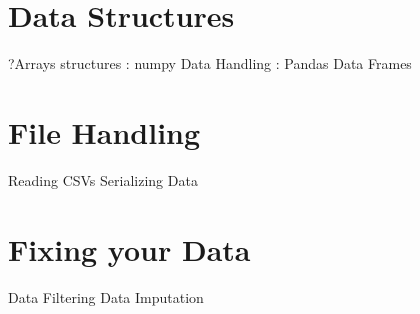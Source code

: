 
\section{Data Structures}
?Arrays structures : numpy
Data Handling : Pandas
Data Frames

\section{File Handling}
Reading CSVs
Serializing Data

\section{Fixing your Data}
Data Filtering
Data Imputation